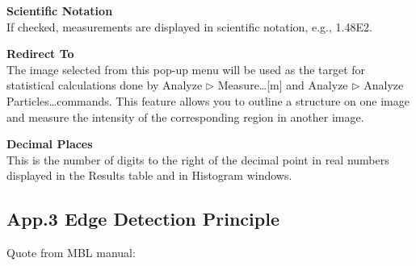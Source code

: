 \textbf{Scientific Notation}\\If checked, measurements are
displayed in scientific notation, e.g., 1.48E2.

\textbf{Redirect To}\\The image selected from this pop-up menu will
be used as the target for statistical calculations done by Analyze
${\triangleright}$ Measure\ldots [m] and Analyze ${\triangleright}$
Analyze Particles\ldots commands. This feature allows you to outline a
structure on one image and measure the intensity of the corresponding
region in another image.

\textbf{Decimal Places}\\This is the number of digits to the right
of the decimal point in real numbers displayed in the Results table and
in Histogram windows.


\clearpage


\subsection{App.3 Edge Detection Principle }
\label{app3}
Quote from MBL manual: 

